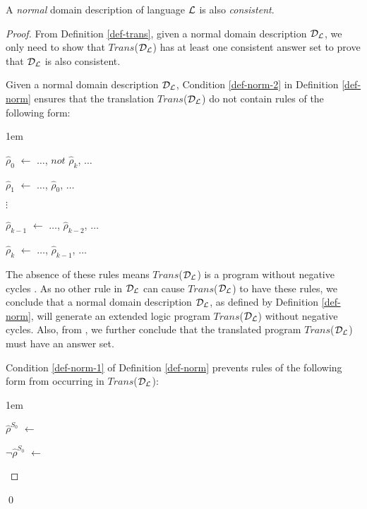 \documentclass[glov2,twocolumn,final]{svjour2}
\newenvironment{vtheorem}[1]
  {\begin{theorem}[#1]\hspace{0.1em}}
  {\end{theorem}}
\newenvironment{vproof}
  {\begin{proof}\hspace{0.1em}}
  {\end{proof}\qed}
\newenvironment{vquote}
  {\begin{list}{}{\leftmargin 1em}\item[]}
  {\end{list}}
\begin{document}
    \begin{vtheorem}{Domain Consistency}
      \label{the-cons}
      A {\em normal} domain description of language ${\cal L}$ is also
      {\em consistent}.
    \end{vtheorem}

    \begin{vproof}
      From Definition \ref{def-trans}, given a normal domain description
      ${\cal D}_{\cal L}$, we only need to show that
      $Trans$(${\cal D}_{\cal L}$) has at least one consistent answer set to
      prove that ${\cal D}_{\cal L}$ is also consistent.

      Given a normal domain description ${\cal D}_{\cal L}$, Condition
      \ref{def-norm-2} in Definition \ref{def-norm} ensures that the
      translation $Trans$(${\cal D}_{\cal L}$) do not contain rules of the
      following form:

      \begin{vquote}
        $\hat{\rho}_{0}$ $\leftarrow$ $\hdots$, $not$ $\hat{\rho}_{k}$, $\hdots$

        $\hat{\rho}_{1}$ $\leftarrow$ $\hdots$, $\hat{\rho}_{0}$, $\hdots$

        $\vdots$

        $\hat{\rho}_{k - 1}$ $\leftarrow$ $\hdots$, $\hat{\rho}_{k - 2}$, $\hdots$

        $\hat{\rho}_{k}$ $\leftarrow$ $\hdots$, $\hat{\rho}_{k - 1}$, $\hdots$
      \end{vquote}

      The absence of these rules means $Trans$(${\cal D}_{\cal L}$) is a
      program without negative cycles \cite{LIN}. As no other rule in
      ${\cal D}_{\cal L}$ can cause $Trans$(${\cal D}_{\cal L}$) to have these
      rules, we conclude that a normal domain description ${\cal D}_{\cal L}$,
      as defined by Definition \ref{def-norm}, will generate an extended logic
      program $Trans$(${\cal D}_{\cal L}$) without negative cycles. Also, from
      \cite{BAR,LIN}, we further conclude that the translated program
      $Trans$(${\cal D}_{\cal L}$) must have an answer set.

      Condition \ref{def-norm-1} of Definition \ref{def-norm} prevents rules
      of the following form from occurring in $Trans$(${\cal D}_{\cal L}$):

      \begin{vquote}
        $\hat{\rho}^{S_{0}}$ $\leftarrow$

        $\lnot\hat{\rho}^{S_{0}}$ $\leftarrow$
      \end{vquote}


\end{vproof}
\end{document}

